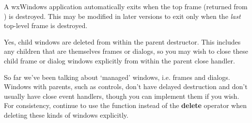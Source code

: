 
A wxWindows application automatically exits when the top frame (returned
from ) is destroyed. This may be modified
in later versions to exit only when the {\it last} top-level frame is destroyed.


Yes, child windows are deleted from within the parent destructor. This includes any children
that are themselves frames or dialogs, so you may wish to close these child frame or dialog windows
explicitly from within the parent close handler.


So far we've been talking about `managed' windows, i.e. frames and dialogs. Windows
with parents, such as controls, don't have delayed destruction and don't usually have
close event handlers, though you can implement them if you wish. For consistency,
continue to use the  function instead
of the {\bf delete} operator when deleting these kinds of windows explicitly.

